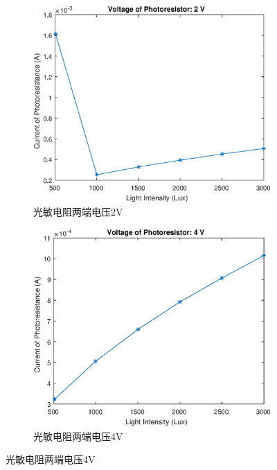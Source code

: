 \documentclass{ctexart}
\begin{document}
\begin{figure}[H]
  \centering
  \begin{subfigure}{.45\textwidth}
    \centering
    \includegraphics[width=\linewidth]{光电传感器综合实验图像/photoresistor_2V}
  \caption{光敏电阻两端电压2V}
  \end{subfigure}
  \begin{subfigure}{.45\textwidth}
    \centering
    \includegraphics[width=\linewidth]{光电传感器综合实验图像/photoresistor_4V}
  \caption{光敏电阻两端电压4V}
  \end{subfigure}

\end{figure}
\end{document}
